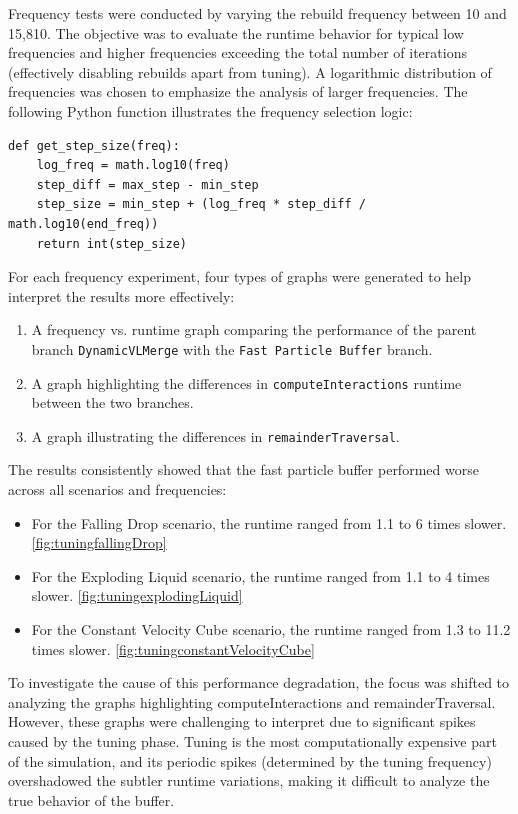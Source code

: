 Frequency tests were conducted by varying the rebuild frequency between 10 and 15,810. The objective was to evaluate the runtime behavior for typical low frequencies and higher frequencies exceeding the total number of iterations (effectively disabling rebuilds apart from tuning). A logarithmic distribution of frequencies was chosen to emphasize the analysis of larger frequencies. The following Python function illustrates the frequency selection logic:

\begin{lstlisting}[style=mypython]
def get_step_size(freq):
    log_freq = math.log10(freq)
    step_diff = max_step - min_step
    step_size = min_step + (log_freq * step_diff / math.log10(end_freq))
    return int(step_size)
\end{lstlisting}

For each frequency experiment, four types of graphs were generated to help interpret the results more effectively:

\begin{enumerate}
    \item A frequency vs. runtime graph comparing the performance of the parent branch \texttt{DynamicVLMerge} with the \texttt{Fast Particle Buffer} branch.
    \item A graph highlighting the differences in \texttt{computeInteractions} runtime between the two branches.
    \item A graph illustrating the differences in \texttt{remainderTraversal}.
\end{enumerate}

The results consistently showed that the fast particle buffer performed worse across all scenarios and frequencies:
\begin{itemize}
    \item For the Falling Drop scenario, the runtime ranged from 1.1 to 6 times slower. \ref{fig:tuningfallingDrop}
    \item For the Exploding Liquid scenario, the runtime ranged from 1.1 to 4 times slower. \ref{fig:tuningexplodingLiquid}
    \item For the Constant Velocity Cube scenario, the runtime ranged from 1.3 to 11.2 times slower. \ref{fig:tuningconstantVelocityCube}
\end{itemize}

To investigate the cause of this performance degradation, the focus was shifted to analyzing the graphs highlighting computeInteractions and remainderTraversal. However, these graphs were challenging to interpret due to significant spikes caused by the tuning phase. Tuning is the most computationally expensive part of the simulation, and its periodic spikes (determined by the tuning frequency) overshadowed the subtler runtime variations, making it difficult to analyze the true behavior of the buffer.


